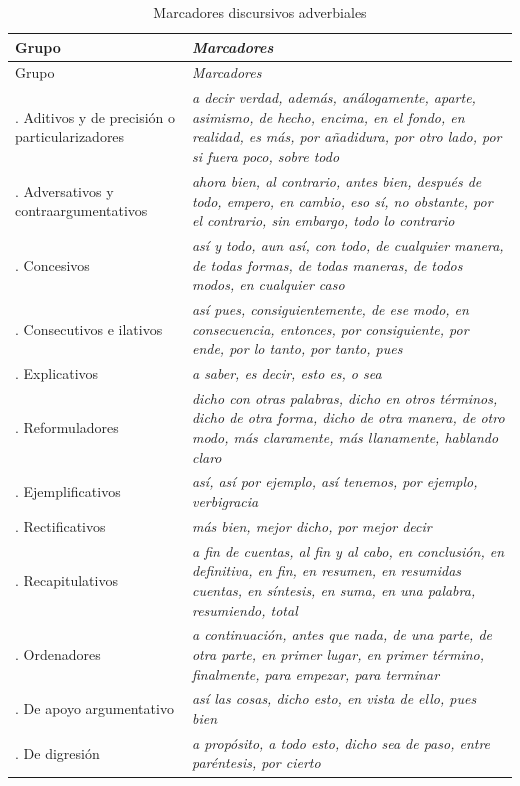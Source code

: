{\small
\begin{longtable}{@{}>{\raggedright\arraybackslash}p{38mm}
    >{\raggedright\arraybackslash\itshape}p{85mm}@{}}
  \caption{Marcadores discursivos adverbiales}\label{tab:12-marcadores}\\
  \toprule
  Grupo & \normalfont Marcadores \\
  \midrule
  \endfirsthead
  \toprule
  Grupo & \normalfont Marcadores \\
  \midrule
  \endhead
  1. Aditivos y de precisión o particularizadores & a decir verdad, además,
    análogamente, aparte, asimismo, de hecho, encima, en el fondo, en realidad,
    es más, por añadidura, por otro lado, por si fuera poco, sobre todo \\
  2. Adversativos y contraargumentativos & ahora bien, al contrario, antes bien,
    después de todo, empero, en cambio, eso sí, no obstante, por el contrario,
    sin embargo, todo lo contrario \\
  3. Concesivos & así y todo, aun así, con todo, de cualquier manera, de todas
    formas, de todas maneras, de todos modos, en cualquier caso \\
  4. Consecutivos e ilativos & así pues, consiguientemente, de ese modo, en
    consecuencia, entonces, por consiguiente, por ende, por lo tanto, por tanto,
    pues \\
  5. Explicativos & a saber, es decir, esto es, o sea \\
  6. Reformuladores & dicho con otras palabras, dicho en otros términos, dicho de
    otra forma, dicho de otra manera, de otro modo, más claramente, más
    llanamente, hablando claro \\
  7. Ejemplificativos & así, así por ejemplo, así tenemos, por ejemplo,
    verbigracia \\
  8. Rectificativos & más bien, mejor dicho, por mejor decir \\
  9. Recapitulativos & a fin de cuentas, al fin y al cabo, en conclusión, en
    definitiva, en fin, en resumen, en resumidas cuentas, en síntesis, en suma,
    en una palabra, resumiendo, total \\
  10. Ordenadores & a continuación, antes que nada, de una parte, de otra parte,
    en primer lugar, en primer término, finalmente, para empezar, para
    terminar \\
  11. De apoyo argumentativo & así las cosas, dicho esto, en vista de ello, pues
    bien \\
  12. De digresión & a propósito, a todo esto, dicho sea de paso, entre
    paréntesis, por cierto \\
  \bottomrule
\end{longtable}}

